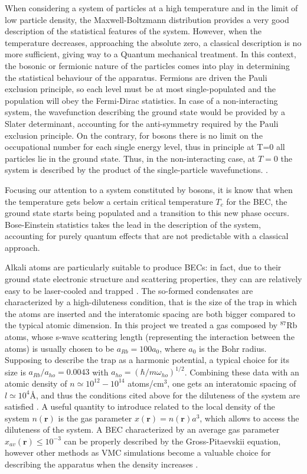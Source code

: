 When considering a system of particles at a high temperature and in the limit of low particle density, the Maxwell-Boltzmann distribution provides a very good description of the statistical features of the system. However, when the temperature decreases, approaching the absolute zero, a classical description is no more sufficient, giving way to a Quantum mechanical treatment. In this context, the bosonic or fermionic nature of the particles comes into play in determining the statistical behaviour of the apparatus. Fermions are driven the Pauli exclusion principle, so each level must be at most single-populated and the population will obey the Fermi-Dirac statistics. In case of a non-interacting system, the wavefunction describing the ground state would be provided by a Slater determinant, accounting for the anti-symmetry required by the Pauli exclusion principle. On the contrary, for bosons there is no limit on the occupational number for each single energy level, thus in principle at T=0 all particles lie in the ground state. Thus, in the non-interacting case, at $T=0$ the system is described by the product of the single-particle wavefunctions. \cite{dalfovo1999}.

Focusing our attention to a system constituted by bosons, it is know that when the temperature gets below a certain critical temperature $T_c$ for the BEC, the ground state starts being populated and a transition to this new phase occurs. Bose-Einstein statistics takes the lead in the description of the system, accounting for purely quantum effects that are not predictable with a classical approach. \cite{dalfovo1999}

Alkali atoms are particularly suitable to produce BECs: in fact, due to their ground state electronic structure and scattering properties, they can are relatively easy to be laser-cooled and trapped \cite{dalfovo1999}. The so-formed condensates are characterized by a high-diluteness condition, that is the size of the trap in which the atoms are inserted and the interatomic spacing are both bigger compared to the typical atomic dimension. In this project we treated a gas composed by $^{87}$Rb atoms, whose s-wave scattering length (representing the interaction between the atoms) is usually chosen to be $a_{Rb} = 100a_0$, where $a_0$ is the Bohr radius. Supposing to describe the trap as a harmonic potential, a typical choice for its size is $a_{Rb}/a_{ho} = 0.0043$ with $a_{ho}= \left( \hbar /m \omega_{ho}\right)^{1/2}$. Combining these data with an atomic density of $n \simeq 10^{12} - 10^{14}$ atoms/cm$^3$, one gets an interatomic spacing of $l\simeq 10^4$\AA, and thus the conditions cited above for the diluteness of the system are satisfied \cite{duBois}. A useful quantity to introduce related to the local density of the system $n(\bm{r})$ is the gas parameter $x(\bm{r}) = n(\bm{r}) a^3$, which allows to access the diluteness of the system. A BEC characterized by an average gas parameter $x_{av}(\bm{r}) \leq 10^{-3}$ can be properly described by the Gross-Pitaevskii equation, however other methods as VMC simulations become a valuable choice for describing the apparatus when the density increases \cite{Nilsen2005}.  


